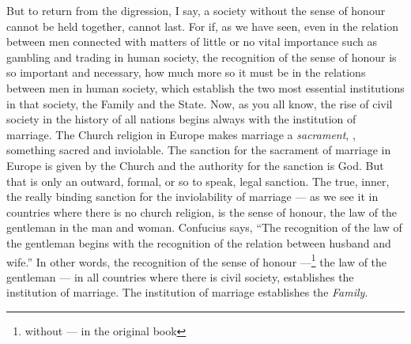 But to return from the digression, I say, a society without the sense of honour cannot be held together, cannot last.
For if, as we have seen, even in the relation between men connected with matters of little or no vital importance such as gambling and trading in human society, the recognition of the sense of honour is so important and necessary, how much more so it must be in the relations between men in human society, which establish the two most essential institutions in that society, the Family and the State.
Now, as you all know, the rise of civil society in the history of all nations begins always with the institution of marriage.
The Church religion in Europe makes marriage a \emph{sacrament}, \ie, something sacred and inviolable.
The sanction for the sacrament of marriage in Europe is given by the Church and the authority for the sanction is God.
But that is only an outward, formal, or so to speak, legal sanction.
The true, inner, the really binding sanction for the inviolability of marriage --- as we see it in countries where there is no church religion, is the sense of honour, the law of the gentleman in the man and woman.
Confucius says, ``The recognition of the law of the gentleman begins with the recognition of the relation between husband and wife.''\cite{num15}
In other words, the recognition of the sense of honour ---\footnote{without --- in the original book} the law of the gentleman --- in all countries where there is civil society, establishes the institution of marriage.
The institution of marriage establishes the \emph{Family}.

